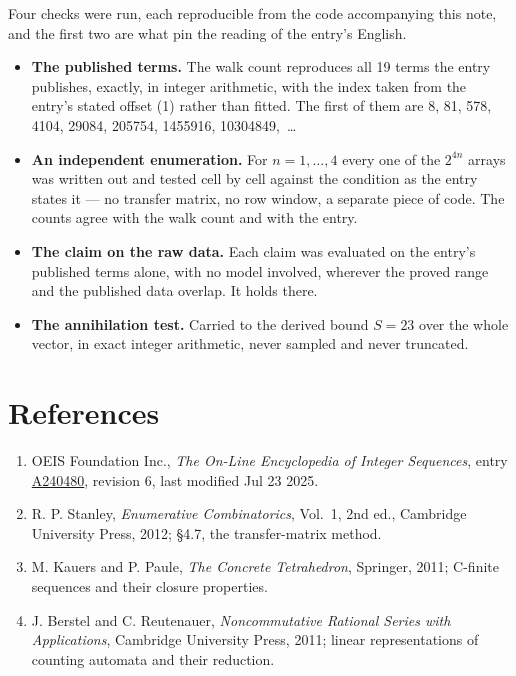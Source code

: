 \documentclass[11pt]{article}
\theoremstyle{definition}
\begin{document}
Four checks were run, each reproducible from the code accompanying this note, and the first two are what pin the reading of the entry's English.

\begin{itemize}

\item {\bfseries The published terms.} The walk count reproduces all 19 terms the entry publishes, exactly, in integer arithmetic, with the index taken from the entry's stated offset (1) rather than fitted. The first of them are 8, 81, 578, 4104, 29084, 205754, 1455916, 10304849,~\dots

\item {\bfseries An independent enumeration.} For $n = 1,\dots,4$ every one of the $2^{4n}$ arrays was written out and tested cell by cell against the condition as the entry states it --- no transfer matrix, no row window, a separate piece of code. The counts agree with the walk count and with the entry.

\item {\bfseries The claim on the raw data.} Each claim was evaluated on the entry's published terms alone, with no model involved, wherever the proved range and the published data overlap. It holds there.

\item {\bfseries The annihilation test.} Carried to the derived bound $S = 23$ over the whole vector, in exact integer arithmetic, never sampled and never truncated.

\end{itemize}

\section{References}

\begin{enumerate}

\item OEIS Foundation Inc., \emph{The On-Line Encyclopedia of Integer Sequences}, entry \href{https://oeis.org/A240480}{A240480}, revision 6, last modified Jul 23 2025.

\item R. P. Stanley, \emph{Enumerative Combinatorics}, Vol.~1, 2nd ed., Cambridge University Press, 2012; \S4.7, the transfer-matrix method.

\item M. Kauers and P. Paule, \emph{The Concrete Tetrahedron}, Springer, 2011; C-finite sequences and their closure properties.

\item J. Berstel and C. Reutenauer, \emph{Noncommutative Rational Series with Applications}, Cambridge University Press, 2011; linear representations of counting automata and their reduction.

\end{enumerate}
\end{document}
